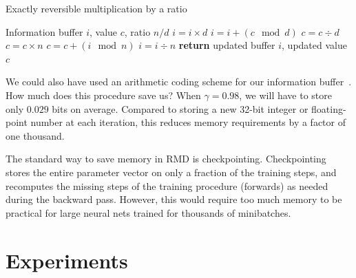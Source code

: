 \documentclass{article}
\newcommand{\decay}{\gamma}
\begin{document}
\begin{algorithm}
   \caption{Exactly reversible multiplication by a ratio}
   \label{alg:reversible-mult}
\begin{algorithmic}[1]
    Information buffer $i$, value $c$, ratio $n / d$
   \State $i = i \times d$                \label{step:f1}
   \State $i = i + (c \! \mod d)$    \label{step:f2}
   \State $c = c \div d$                    \label{step:f3}
   \State $c = c \times n$                  \label{step:b1}
   \State $c = c +  (i \! \mod n)$          \label{step:b2}
   \State $i = i \div n$               \label{step:b3}
   \State \textbf{return} updated buffer $i$, updated value $c$
\end{algorithmic}
\end{algorithm}

We could also have used an arithmetic coding scheme for our information buffer~\citep[Chapter 6]{mackay2003information}.
How much does this procedure save us? When $\decay =  0.98$, we will have
to store only $0.029$ bits on average. Compared to storing a new 32-bit integer or
floating-point number at each iteration, this reduces memory requirements by a factor of one thousand.

The standard way to save memory in RMD is checkpointing. 
Checkpointing stores the entire parameter vector on only a fraction of the training steps, and recomputes the missing steps of the training procedure (forwards) as needed during the backward pass.
However, this would require too much memory to be practical for large neural nets trained
for thousands of minibatches.

\section{Experiments}
\label{sec:experiments}

\end{document}
